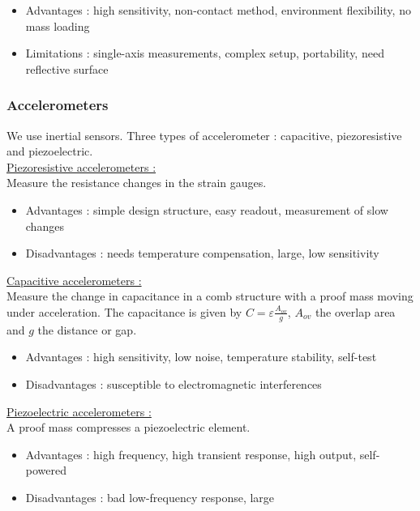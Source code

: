 \documentclass[../main.tex]{subfiles}
\begin{document}
\begin{itemize}
    \item Advantages : high sensitivity, non-contact method, environment flexibility, no mass loading\\
    \item Limitations : single-axis measurements, complex setup, portability, need reflective surface\\
\end{itemize}

\subsubsection{Accelerometers}
We use inertial sensors. Three types of accelerometer : capacitive, piezoresistive and piezoelectric.\\

\quad \underline{Piezoresistive accelerometers :}\\
Measure the resistance changes in the strain gauges. \\

\begin{itemize}
    \item Advantages : simple design structure, easy readout, measurement of slow changes\\
    \item Disadvantages : needs temperature compensation, large, low sensitivity\\
\end{itemize}

\quad \underline{Capacitive accelerometers :}\\
Measure the change in capacitance in a comb structure with a proof mass moving under acceleration. The capacitance is given by $C = \varepsilon \frac{A_{ov}}{g}$, $A_{ov}$ the overlap area and $g$ the distance or gap.\\

\begin{itemize}
    \item Advantages : high sensitivity, low noise, temperature stability, self-test\\
    \item Disadvantages : susceptible to electromagnetic interferences\\
\end{itemize}

\quad \underline{Piezoelectric accelerometers :}\\
A proof mass compresses a piezoelectric element.\\
\begin{itemize}
    \item Advantages : high frequency, high transient response, high output, self-powered\\
    \item Disadvantages : bad low-frequency response, large\\
\end{itemize}
\end{document}
